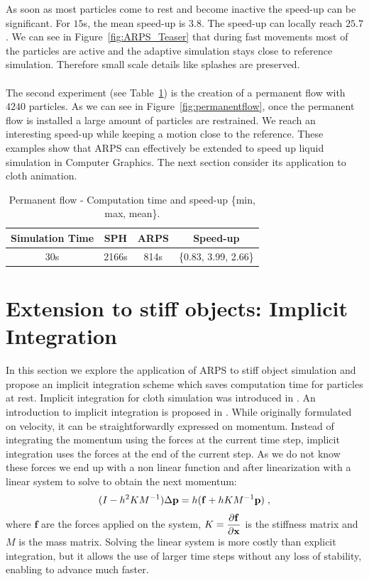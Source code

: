 As soon as most particles come to rest and become inactive the speed-up can be significant.
For $15$s, the mean speed-up is $3.8$.
The speed-up can locally reach $25.7$.
We can see in Figure~\ref{fig:ARPS_Teaser} that during fast movements most of the particles are active and the adaptive simulation stays close to reference simulation.
Therefore small scale details like splashes are preserved.
\\ \\
The second experiment (see Table~\ref{table:perf2}) is the creation of a permanent flow with $4240$ particles. As we can see in Figure~\ref{fig:permanentflow}, once the permanent flow is installed a large amount of particles are restrained. We reach an interesting speed-up while keeping a motion close to the reference.
These examples show that ARPS can effectively be extended to speed up liquid simulation in Computer Graphics. The next section consider its application to cloth animation.
\begin{table}[h!]
    \centering
\begin{tabular}{|c|c|c|c|} \hline
    Simulation Time & SPH       & ARPS    & Speed-up \\ \hline
    30s         & 2166s     & 814s              & \{0.83, 3.99, 2.66\} \\ \hline
\end{tabular}
\caption[ARPS: Permanent flow - Measurements]{\label{table:perf2}Permanent flow - Computation time and speed-up \small{\{min, max, mean\}}.}
\end{table}

\section{Extension to stiff objects: Implicit Integration} 
\label{sec:arps_implicit}
In this section we explore the application of ARPS to stiff object simulation and propose an implicit integration scheme which saves computation time for particles at rest.
Implicit integration for cloth simulation was introduced in \cite{Baraff1998}. An introduction to implicit integration is proposed in \cite{Witkin2001}.
While originally formulated on velocity, it can be straightforwardly expressed on momentum.
Instead of integrating the momentum using the forces at the current time step, implicit integration uses the forces at the end of the current step.
As we do not know these forces we end up with a non linear function and after linearization with a linear system to solve to obtain the next momentum:
\begin{equation}
    \label{eq:implicit}
    ( I -h^{2}KM^{-1} ) \Delta \mathbf{p} = h( \mathbf{f} + h KM^{-1}\mathbf{p} ) \;,
\end{equation}
where $\mathbf{f}$ are the forces applied on the system, $\displaystyle K = \frac{\partial \mathbf{f}}{ \partial \mathbf{x}}$ is the stiffness matrix and
$M$ is the mass matrix.
Solving the linear system is more costly than explicit integration, but it allows the use of larger time steps without any loss of stability, enabling to advance much faster.
